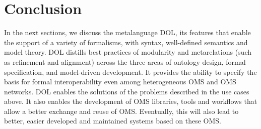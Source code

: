 \documentclass[10pt,%
\ifpretendfinal
final%
\else
draft%
\fi,
]{scrreprt}
\begin{document}
\section{Conclusion}

In the next sections, we discuss  the metalanguage DOL, its features that enable the support of a variety of formalisms, with syntax, well-defined semantics and model theory. DOL 
distills best practices of modularity and metarelations (such as refinement and alignment) across the three areas of ontology design, formal 
specification, and model-driven development. It provides the ability to specify the basis for formal interoperability even among heterogeneous OMS and OMS networks. DOL enables the solutions of the problems described in the use cases above. It also enables the development of OMS libraries, tools and workflows that 
allow  a better exchange and reuse of OMS. Eventually, this will also lead to better, easier developed and maintained systems based on these OMS.
\end{document}
